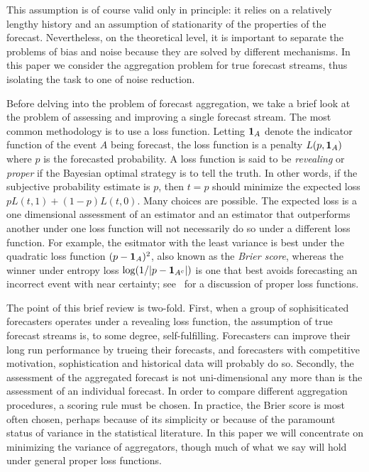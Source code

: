 \documentclass[11pt]{article}
\theoremstyle{definition}
\theoremstyle{definition}
\def\one{{\bf 1}}
\begin{document}
This assumption is of course valid only in principle: 
it relies on a relatively lengthy history and an assumption
of stationarity of the properties of the forecast.  Nevertheless,
on the theoretical level, it is important to separate the problems 
of bias and noise because they are solved by different mechanisms.
In this paper we consider the aggregation problem for true forecast
streams, thus isolating the task to one of noise reduction.  

Before delving into the problem of forecast aggregation, we take
a brief look at the problem of assessing and improving a single
forecast stream.  The most common methodology is to use a loss
function.  Letting $\one_A$ denote the indicator function of the
event $A$ being forecast, the loss function is a penalty 
$L(p , \one_A)$ where $p$ is the forecasted probability.
A loss function is said to be {\em revealing} or {\em proper}
if the Bayesian optimal strategy is to tell the truth.  In other words, 
if the subjective probability estimate is $p$, then $t = p$ should
minimize the expected loss $p L(t,1) + (1-p) L(t,0)$.  Many
choices are possible.  The expected loss is a one dimensional
assessment of an estimator and an estimator that outperforms 
another under one loss function will not necessarily do so
under a different loss function.  For example, the esitmator with 
the least variance is best under the quadratic loss function
$(p - \one_A)^2$, also known as the {\em Brier score}, 
whereas the winner under entropy loss $\log (1 / |p - \one_{A^c}|)$ 
is one that best avoids forecasting an incorrect event with near 
certainty; see~\citet[Section~2]{HwPe1997} for a discussion of
proper loss functions.

The point of this brief review is two-fold.  First, when a group of
sophisiticated forecasters operates under a revealing loss function,
the assumption of true forecast streams is, to some degree, 
self-fulfilling.  Forecasters can improve their long run 
performance by trueing their forecasts, and forecasters with 
competitive motivation, sophistication and historical data
will probably do so.  Secondly, the assessment of the aggregated forecast
is not uni-dimensional any more than is the assessment of an
individual forecast.  In order to compare different aggregation 
procedures, a scoring rule must be chosen.  In practice, the
Brier score is most often chosen, perhaps because of its simplicity
or because of the paramount status of variance in the statistical
literature.  In this paper we will concentrate on minimizing the
variance of aggregators, though much of what we say will hold under
general proper loss functions.
\end{document}
